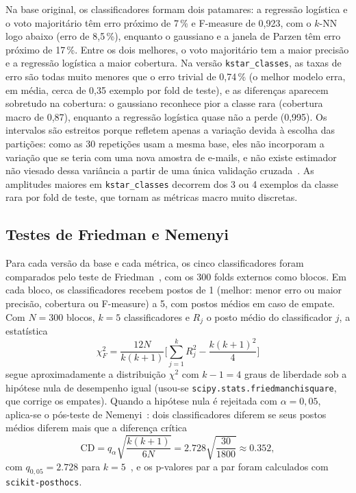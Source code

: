 \documentclass[11pt,a4paper]{article}
\begin{document}
Na base original, os classificadores formam dois patamares: a regressão logística e o voto majoritário têm erro próximo de 7\,\% 
e F-measure de 0,923, com o $k$-NN logo abaixo (erro de 8,5\,\%), enquanto o gaussiano e a janela de Parzen têm erro próximo 
de 17\,\%. Entre os dois melhores, o voto majoritário tem a maior precisão e a regressão logística a maior cobertura. Na versão \texttt{kstar\_classes}, 
as taxas de erro são todas muito menores que o erro trivial de 0,74\,\% (o melhor modelo erra, em média, cerca de 0,35 exemplo por fold de teste), 
e as diferenças aparecem sobretudo na cobertura: o gaussiano reconhece pior a classe rara (cobertura macro de 0,87), enquanto a regressão logística 
quase não a perde (0,995). Os intervalos são estreitos porque refletem apenas a variação devida à escolha das partições: como as 30 repetições usam a 
mesma base, eles não incorporam a variação que se teria com uma nova amostra de e-mails, e não existe estimador não viesado dessa variância a partir de 
uma única validação cruzada~\cite{bengio2004noUnbiased}. As amplitudes maiores em \texttt{kstar\_classes} decorrem dos 3 ou 4 exemplos da classe rara 
por fold de teste, que tornam as métricas macro muito discretas.

\subsection{Testes de Friedman e Nemenyi}\label{sec:friedman}

Para cada versão da base e cada métrica, os cinco classificadores foram comparados pelo teste de Friedman~\cite{friedman1937ranks}, com os 300 folds 
externos como blocos. Em cada bloco, os classificadores recebem postos de 1 (melhor: menor erro ou maior precisão, cobertura ou F-measure) a 5, 
com postos médios em caso de empate. Com $N=300$ blocos, $k=5$ classificadores e $R_j$ o posto médio do classificador $j$, a estatística
\begin{equation}
\chi^2_F=\frac{12N}{k(k+1)}\Big[\sum_{j=1}^{k}R_j^2-\frac{k(k+1)^2}{4}\Big]
\end{equation}
segue aproximadamente a distribuição $\chi^2$ com $k-1=4$ graus de liberdade sob a hipótese nula de desempenho
igual (usou-se \texttt{scipy.stats.friedmanchisquare}, que corrige os empates). Quando a hipótese nula é rejeitada
com $\alpha=0{,}05$, aplica-se o pós-teste de Nemenyi~\cite{nemenyi1963distribution,demsar2006statistical}:
dois classificadores diferem se seus postos médios diferem mais que a diferença crítica
\begin{equation}
\mathrm{CD}=q_{\alpha}\sqrt{\frac{k(k+1)}{6N}}=\num{2.728}\sqrt{\frac{30}{1800}}\approx\num{0.352},
\end{equation}
com $q_{0{,}05}=\num{2.728}$ para $k=5$~\cite{demsar2006statistical}, e os p-valores par a par foram calculados
com \texttt{scikit-posthocs}.
\end{document}
